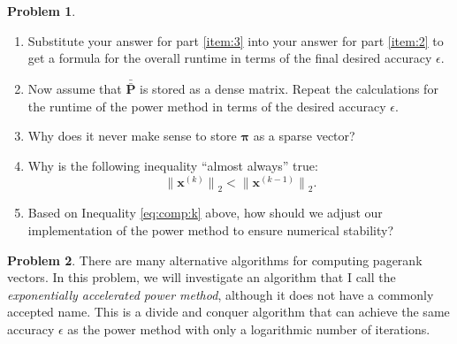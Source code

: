 \documentclass[10pt]{article}
\theoremstyle{definition}
\newtheorem{problem}{Problem}
\newcommand{\p}{\mathbf P}
\newcommand{\pb}{\bar {\p}}
\newcommand{\pbb}{\bar {\pb}}
\newcommand{\pr}{\bm \pi}
\newcommand{\x}{\mathbf x}
\newcommand{\ltwo}[1]{{\lVert {#1} \rVert}_2}
\begin{document}
{\begin{problem}
\begin{enumerate}
        \item
            Substitute your answer for part \ref{item:3} into your answer for part \ref{item:2} to get a formula for the overall runtime in terms of the final desired accuracy $\epsilon$.
            \vspace{4in}

        \item
            Now assume that $\pbb$ is stored as a dense matrix.
            Repeat the calculations for the runtime of the power method in terms of the desired accuracy $\epsilon$.
            \vspace{4in}


            \newpage
        \item
            Why does it never make sense to store $\pr$ as a sparse vector?
            \vspace{2in}

            \newpage
        \item
            Why is the following inequality ``almost always'' true:
            \begin{equation}
                \label{eq:comp:k}
                \ltwo{\x^{(k)}} < \ltwo{\x^{(k-1)}}
                .
            \end{equation}
            \vspace{4in}
        \item
            Based on Inequality \eqref{eq:comp:k} above,
            how should we adjust our implementation of the power method to ensure numerical stability?

    \end{enumerate}
\end{problem}


\newpage
\begin{problem}
    There are many alternative algorithms for computing pagerank vectors.
    In this problem, we will investigate an algorithm that I call the \emph{exponentially accelerated power method},
    although it does not have a commonly accepted name.
    This is a divide and conquer algorithm that can achieve the same accuracy $\epsilon$ as the power method with only a logarithmic number of iterations.


\end{problem}}
\end{document}
